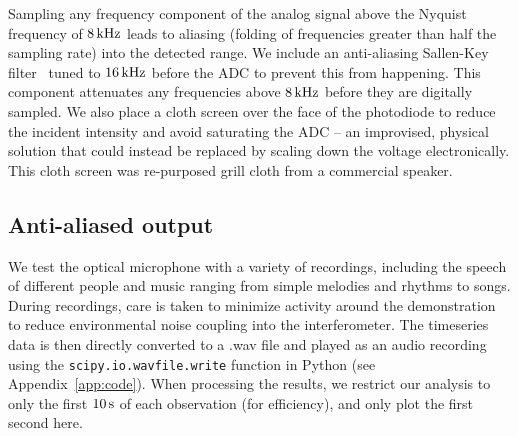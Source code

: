 \documentclass[paper-main.tex]{subfiles}
\begin{document}
Sampling any frequency component of the analog signal above the Nyquist frequency of $8\,{\rm kHz}$ leads to aliasing (folding of frequencies greater than half the sampling rate) into the detected range. We include an anti-aliasing Sallen-Key filter~\cite{sallen_key_filter} tuned to $16\,{\rm kHz}$ before the ADC to prevent this from happening.
This component attenuates any frequencies above $8\,{\rm kHz}$ before they are digitally sampled. We also place a cloth screen over the face of the photodiode to reduce the incident intensity and avoid saturating the ADC -- an improvised, physical solution that could instead be replaced by scaling down the voltage electronically. This cloth screen was re-purposed grill cloth from a commercial speaker.


\subsection{Anti-aliased output}
\label{sec:initialResultsOpMic}

We test the optical microphone with a variety of recordings, including the speech of different people and music ranging from simple melodies and rhythms to songs. 
During recordings, care is taken to minimize activity around the demonstration to reduce environmental noise coupling into the interferometer. 
The timeseries data is then directly converted to a .wav file and played as an audio recording using the \texttt{scipy.io.wavfile.write} function in Python (see Appendix~\ref{app:code}). %
When processing the results, we restrict our analysis to only the first $10\,{\rm s}$ of each observation (for efficiency), and only plot the first second here. 
\end{document}
